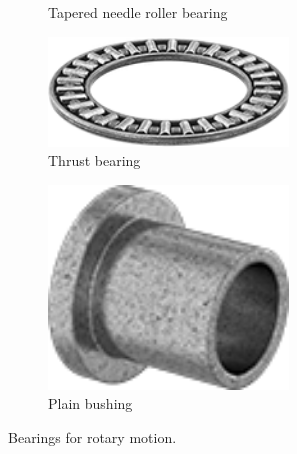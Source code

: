 \begin{figure}[H]
\begin{subfigure}[b]{.32\linewidth}
			\caption{Tapered needle roller bearing}
		\end{subfigure}
		\begin{subfigure}[b]{.32\linewidth}
			\includegraphics[width=0.7\textwidth]{imgs/thrustbearing.png}
			\caption{Thrust bearing}
		\end{subfigure}
		\begin{subfigure}[b]{.32\linewidth}
			\includegraphics[width=0.7\textwidth]{imgs/plainbushing.png}
			\caption{Plain bushing}
		\end{subfigure}
		
		\caption{Bearings for rotary motion.}
	\end{figure}
	
